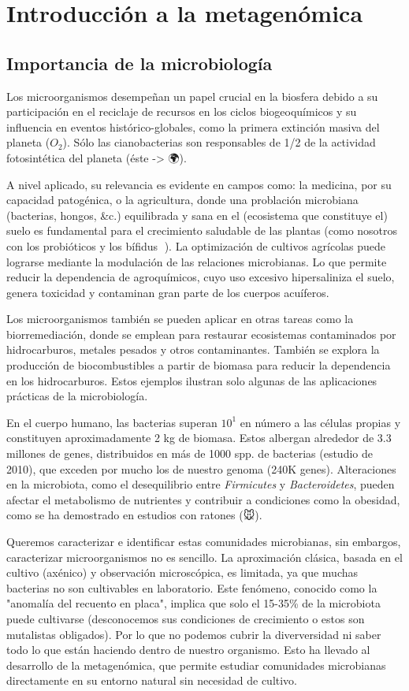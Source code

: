 \chapter{Introducción a la metagenómica}
\section{Importancia de la microbiología}
Los microorganismos desempeñan un papel crucial en la biosfera debido a su participación en el reciclaje de recursos en los ciclos biogeoquímicos y su influencia en eventos histórico-globales, como la primera extinción masiva del planeta ($O_2$). Sólo las cianobacterias son responsables de 1/2 de la actividad fotosintética del planeta (éste -> 🌍).

A nivel aplicado, su relevancia es evidente en campos como: la medicina, por su capacidad patogénica, o la agricultura, donde una problación microbiana (bacterias, hongos, &c.) equilibrada y sana en el (ecosistema que constituye el) suelo es fundamental para el crecimiento saludable de las plantas (como nosotros con los probióticos y los bífidus 👺). La optimización de cultivos agrícolas puede lograrse mediante la modulación de las relaciones microbianas. Lo que permite reducir la dependencia de agroquímicos, cuyo uso excesivo hipersaliniza el suelo, genera toxicidad y contaminan gran parte de los cuerpos acuíferos. 

Los microorganismos también se pueden aplicar en otras tareas como la biorremediación, donde se emplean para restaurar ecosistemas contaminados por hidrocarburos, metales pesados y otros contaminantes. También se explora la producción de biocombustibles a partir de biomasa para reducir la dependencia en los hidrocarburos. Estos ejemplos ilustran solo algunas de las aplicaciones prácticas de la microbiología.

En el cuerpo humano, las bacterias superan $10^1$ en número a las células propias y constituyen aproximadamente 2 kg de biomasa. Estos albergan alrededor de 3.3 millones de genes, distribuidos en más de 1000 spp. de bacterias (estudio de 2010), que exceden por mucho los de nuestro genoma (240K genes). Alteraciones en la microbiota, como el desequilibrio entre \textit{Firmicutes} y \textit{Bacteroidetes}, pueden afectar el metabolismo de nutrientes y contribuir a condiciones como la obesidad, como se ha demostrado en estudios con ratones (🐭). 

Queremos caracterizar e identificar estas comunidades microbianas, sin embargos, caracterizar microorganismos no es sencillo. La aproximación clásica, basada en el cultivo (axénico) y observación microscópica, es limitada, ya que muchas bacterias no son cultivables en laboratorio. Este fenómeno, conocido como la "anomalía del recuento en placa", implica que solo el 15-35\% de la microbiota puede cultivarse (desconocemos sus condiciones de crecimiento o estos son mutalistas obligados). Por lo que no podemos cubrir la diverversidad ni saber todo lo que están haciendo dentro de nuestro organismo. Esto ha llevado al desarrollo de la metagenómica, que permite estudiar comunidades microbianas directamente en su entorno natural sin necesidad de cultivo.

